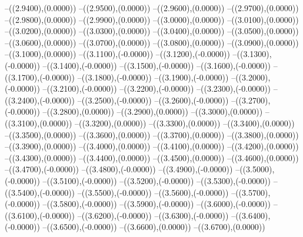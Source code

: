 {	--({\sx*(2.9400)},{\sy*(0.0000)})
	--({\sx*(2.9500)},{\sy*(0.0000)})
	--({\sx*(2.9600)},{\sy*(0.0000)})
	--({\sx*(2.9700)},{\sy*(0.0000)})
	--({\sx*(2.9800)},{\sy*(0.0000)})
	--({\sx*(2.9900)},{\sy*(0.0000)})
	--({\sx*(3.0000)},{\sy*(0.0000)})
	--({\sx*(3.0100)},{\sy*(0.0000)})
	--({\sx*(3.0200)},{\sy*(0.0000)})
	--({\sx*(3.0300)},{\sy*(0.0000)})
	--({\sx*(3.0400)},{\sy*(0.0000)})
	--({\sx*(3.0500)},{\sy*(0.0000)})
	--({\sx*(3.0600)},{\sy*(0.0000)})
	--({\sx*(3.0700)},{\sy*(0.0000)})
	--({\sx*(3.0800)},{\sy*(0.0000)})
	--({\sx*(3.0900)},{\sy*(0.0000)})
	--({\sx*(3.1000)},{\sy*(0.0000)})
	--({\sx*(3.1100)},{\sy*(-0.0000)})
	--({\sx*(3.1200)},{\sy*(-0.0000)})
	--({\sx*(3.1300)},{\sy*(-0.0000)})
	--({\sx*(3.1400)},{\sy*(-0.0000)})
	--({\sx*(3.1500)},{\sy*(-0.0000)})
	--({\sx*(3.1600)},{\sy*(-0.0000)})
	--({\sx*(3.1700)},{\sy*(-0.0000)})
	--({\sx*(3.1800)},{\sy*(-0.0000)})
	--({\sx*(3.1900)},{\sy*(-0.0000)})
	--({\sx*(3.2000)},{\sy*(-0.0000)})
	--({\sx*(3.2100)},{\sy*(-0.0000)})
	--({\sx*(3.2200)},{\sy*(-0.0000)})
	--({\sx*(3.2300)},{\sy*(-0.0000)})
	--({\sx*(3.2400)},{\sy*(-0.0000)})
	--({\sx*(3.2500)},{\sy*(-0.0000)})
	--({\sx*(3.2600)},{\sy*(-0.0000)})
	--({\sx*(3.2700)},{\sy*(-0.0000)})
	--({\sx*(3.2800)},{\sy*(0.0000)})
	--({\sx*(3.2900)},{\sy*(0.0000)})
	--({\sx*(3.3000)},{\sy*(0.0000)})
	--({\sx*(3.3100)},{\sy*(0.0000)})
	--({\sx*(3.3200)},{\sy*(0.0000)})
	--({\sx*(3.3300)},{\sy*(0.0000)})
	--({\sx*(3.3400)},{\sy*(0.0000)})
	--({\sx*(3.3500)},{\sy*(0.0000)})
	--({\sx*(3.3600)},{\sy*(0.0000)})
	--({\sx*(3.3700)},{\sy*(0.0000)})
	--({\sx*(3.3800)},{\sy*(0.0000)})
	--({\sx*(3.3900)},{\sy*(0.0000)})
	--({\sx*(3.4000)},{\sy*(0.0000)})
	--({\sx*(3.4100)},{\sy*(0.0000)})
	--({\sx*(3.4200)},{\sy*(0.0000)})
	--({\sx*(3.4300)},{\sy*(0.0000)})
	--({\sx*(3.4400)},{\sy*(0.0000)})
	--({\sx*(3.4500)},{\sy*(0.0000)})
	--({\sx*(3.4600)},{\sy*(0.0000)})
	--({\sx*(3.4700)},{\sy*(-0.0000)})
	--({\sx*(3.4800)},{\sy*(-0.0000)})
	--({\sx*(3.4900)},{\sy*(-0.0000)})
	--({\sx*(3.5000)},{\sy*(-0.0000)})
	--({\sx*(3.5100)},{\sy*(-0.0000)})
	--({\sx*(3.5200)},{\sy*(-0.0000)})
	--({\sx*(3.5300)},{\sy*(-0.0000)})
	--({\sx*(3.5400)},{\sy*(-0.0000)})
	--({\sx*(3.5500)},{\sy*(-0.0000)})
	--({\sx*(3.5600)},{\sy*(-0.0000)})
	--({\sx*(3.5700)},{\sy*(-0.0000)})
	--({\sx*(3.5800)},{\sy*(-0.0000)})
	--({\sx*(3.5900)},{\sy*(-0.0000)})
	--({\sx*(3.6000)},{\sy*(-0.0000)})
	--({\sx*(3.6100)},{\sy*(-0.0000)})
	--({\sx*(3.6200)},{\sy*(-0.0000)})
	--({\sx*(3.6300)},{\sy*(-0.0000)})
	--({\sx*(3.6400)},{\sy*(-0.0000)})
	--({\sx*(3.6500)},{\sy*(-0.0000)})
	--({\sx*(3.6600)},{\sy*(0.0000)})
	--({\sx*(3.6700)},{\sy*(0.0000)})
}
